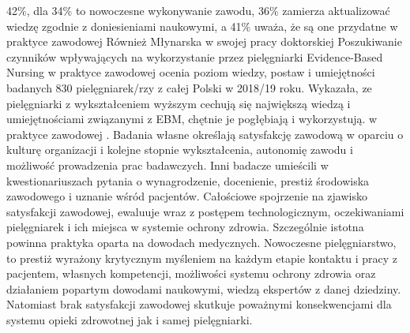\documentclass[a4paper,12pt,twoside,openright]{mwrep}
\begin{document}
42\%, dla 34\% to nowoczesne wykonywanie zawodu, 36\% zamierza aktualizować wiedzę zgodnie z doniesieniami naukowymi, a 41\% uważa, że są one przydatne w praktyce zawodowej \cite{gotlib} Również Młynarska w swojej pracy doktorskiej  Poszukiwanie czynników wpływających na wykorzystanie przez pielęgniarki Evidence-Based Nursing w praktyce zawodowej ocenia poziom wiedzy, postaw i umiejętności badanych 830 pielęgniarek/rzy z całej Polski  w 2018/19 roku. Wykazała, ze pielęgniarki z wykształceniem wyższym cechują się największą wiedzą i umiejętnościami związanymi z EBM, chętnie je  pogłębiają i wykorzystują. w praktyce zawodowej \cite{EBM}. Badania własne określają satysfakcję zawodową w oparciu o kulturę organizacji i kolejne stopnie wykształcenia, autonomię zawodu i możliwość prowadzenia prac badawczych. Inni badacze umieścili w kwestionariuszach pytania o wynagrodzenie, docenienie, prestiż środowiska zawodowego i uznanie wśród pacjentów. Całościowe spojrzenie na zjawisko satysfakcji zawodowej, ewaluuje wraz z postępem technologicznym, oczekiwaniami pielęgniarek i ich miejsca w systemie ochrony zdrowia. Szczególnie istotna powinna praktyka oparta na dowodach medycznych. Nowoczesne pielęgniarstwo, to prestiż wyrażony krytycznym myśleniem na każdym etapie kontaktu i pracy z pacjentem, własnych kompetencji, możliwości systemu ochrony zdrowia oraz działaniem popartym dowodami naukowymi, wiedzą ekspertów z danej dziedziny. Natomiast brak satysfakcji zawodowej skutkuje poważnymi konsekwencjami dla systemu opieki zdrowotnej jak i samej pielęgniarki.

\end{document}
